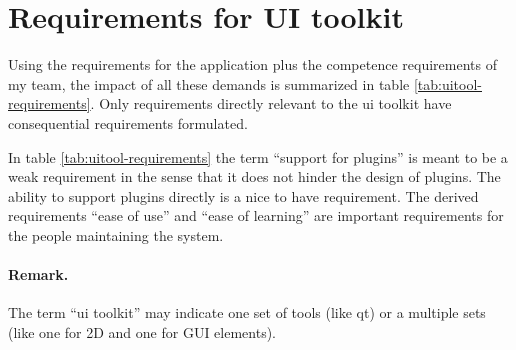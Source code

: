 \section{Requirements for UI toolkit}

Using the requirements for the application plus the competence requirements of
my team, the impact of all these demands is summarized in table
\ref{tab:uitool-requirements}. Only requirements directly relevant to the ui
toolkit have consequential requirements formulated.

In table \ref{tab:uitool-requirements} the term ``support for plugins'' is
meant to be a weak requirement in the sense that it does not hinder the design
of plugins. The ability to support plugins directly is a nice to have
requirement. The derived requirements ``ease of use'' and ``ease of learning''
are important requirements for the people maintaining the system.

\paragraph{Remark.} The term ``ui toolkit'' may indicate one set of tools (like
qt) or a multiple sets (like one for 2D and one for GUI elements).

